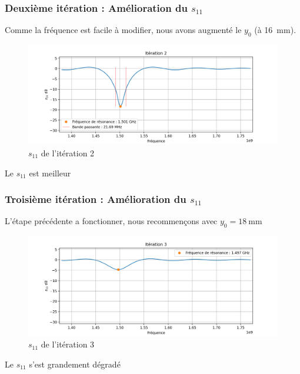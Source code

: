 \documentclass[Deriaz_Traiber_Labo02.tex]{subfiles}
\begin{document}
\subsubsection{Deuxième itération : Amélioration du $s_{11}$}
Comme la fréquence est facile à modifier, nous avons augmenté le $y_0$ (à \SI{16}{\milli\meter}).
\begin{figure}[H]
\centering
\includegraphics[width=15cm]{../Calculs/run_id_ceramique_2.png}
\caption[caption]{$s_{11}$ de l'itération 2}
\end{figure}
Le $s_{11}$ est meilleur
\subsubsection{Troisième itération : Amélioration du $s_{11}$}
L'étape précédente a fonctionner, nous recommençons avec $y_0=\SI{18}{\milli\meter}$
\begin{figure}[H]
\centering
\includegraphics[width=15cm]{../Calculs/run_id_ceramique_3.png}
\caption[caption]{$s_{11}$ de l'itération 3}
\end{figure}
Le $s_{11}$ s'est grandement dégradé
\pagebreak
\end{document}

